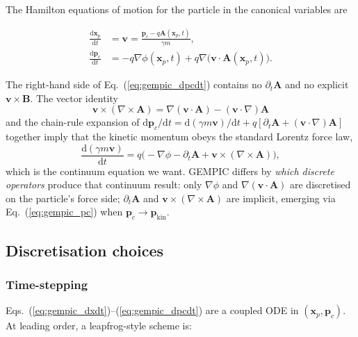 \documentclass[11pt,a4paper]{article}
\newcommand{\vv}[1]{\mathbf{#1}}
\newcommand{\dd}{\mathrm{d}}
\begin{document}
The Hamilton equations of motion for the particle in the canonical
variables are
\begin{eqbox}
\begin{align}
\frac{\dd \vv{x}_p}{\dd t} &= \vv{v} = \frac{\vv{p}_c - q\vv{A}(\vv{x}_p, t)}{\gamma m}, \label{eq:gempic_dxdt}\\
\frac{\dd \vv{p}_c}{\dd t} &= -q \nabla\phi(\vv{x}_p, t) + q \nabla\big(\vv{v}\cdot\vv{A}(\vv{x}_p, t)\big). \label{eq:gempic_dpcdt}
\end{align}
\end{eqbox}
The right-hand side of Eq.~(\ref{eq:gempic_dpcdt}) contains no
$\partial_t \vv{A}$ and no explicit $\vv{v}\times\vv{B}$.  The vector
identity
\begin{equation}
\vv{v}\times(\nabla\times\vv{A}) = \nabla(\vv{v}\cdot\vv{A}) - (\vv{v}\cdot\nabla)\vv{A}
\label{eq:vector_identity}
\end{equation}
and the chain-rule expansion of
$\dd \vv{p}_c / \dd t = \dd (\gamma m \vv{v}) / \dd t + q [\partial_t \vv{A} + (\vv{v}\cdot\nabla)\vv{A}]$
together imply that the kinetic momentum obeys the standard Lorentz
force law,
\begin{equation}
\frac{\dd (\gamma m \vv{v})}{\dd t}
= q\big(-\nabla\phi - \partial_t\vv{A} + \vv{v}\times(\nabla\times\vv{A})\big),
\end{equation}
which is the continuum equation we want.  GEMPIC differs by
\emph{which discrete operators} produce that continuum result: only
$\nabla\phi$ and $\nabla(\vv{v}\cdot\vv{A})$ are discretised on the
particle's force side; $\partial_t\vv{A}$ and
$\vv{v}\times(\nabla\times\vv{A})$ are implicit, emerging via
Eq.~(\ref{eq:gempic_pc}) when $\vv{p}_c \to \vv{p}_{\mathrm{kin}}$.

\subsection{Discretisation choices}

\subsubsection*{Time-stepping}

Eqs.~(\ref{eq:gempic_dxdt})--(\ref{eq:gempic_dpcdt}) are a coupled ODE
in $(\vv{x}_p, \vv{p}_c)$.  At leading order, a leapfrog-style
scheme is:
\end{document}
